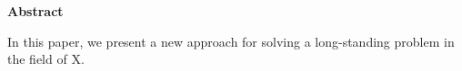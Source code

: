 \thispagestyle{empty}
\begin{center}
	\textbf{\LARGE Abstract}
\end{center}
	In this paper, we present a new approach for solving a long-standing problem in the field of X.
\cleardoublepage
